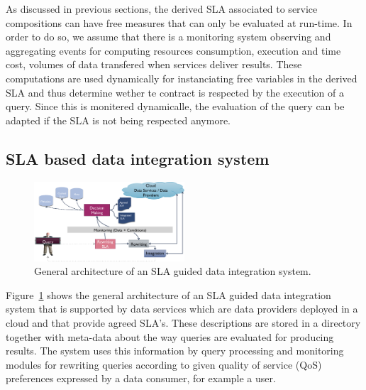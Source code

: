 As discussed in previous sections, the derived SLA associated to service compositions can have free measures that can only be evaluated at run-time. In order to do so, we assume that there is a monitoring system observing and aggregating events for computing resources consumption, execution and time cost, volumes of data transfered when services deliver results. These computations are used dynamically for instanciating free variables in the derived SLA and thus determine wether te contract is respected by the execution of a query. Since this is monitered dynamicalle, the evaluation of the query can be adapted if the SLA is not being respected anymore.


\subsection{SLA based data integration system}
\label{sec:architecture}
\begin{figure}
\includegraphics[width=0.5\textwidth]{figs/arch.png}
\caption{General architecture of an SLA guided  data integration system.\label{fig:arch}}
\end{figure}

Figure~\ref{fig:arch} shows the general architecture of an SLA guided data integration system that is supported by data services which are data providers deployed in a cloud and that provide agreed SLA’s. 
These descriptions are stored in a directory together with meta-data about the way queries are evaluated for producing results. 
The system uses this information  by query processing and monitoring modules for rewriting queries according to given quality of service (QoS) preferences expressed by a data consumer, for example a user.
